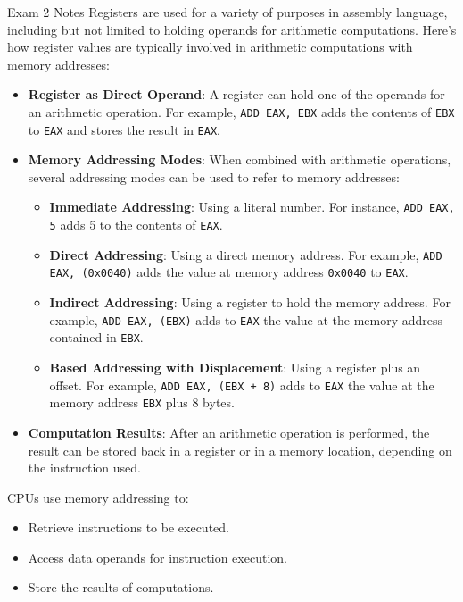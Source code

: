 \begin{examnotes}{Exam 2 Notes}
    Registers are used for a variety of purposes in assembly language, including but not limited to holding operands for arithmetic computations. Here's how register values are typically involved in 
    arithmetic computations with memory addresses:

    \begin{itemize}
        \item \textbf{Register as Direct Operand}: A register can hold one of the operands for an arithmetic operation. For example, \texttt{ADD EAX, EBX} adds the contents of \texttt{EBX} to \texttt{EAX} 
        and stores the result in \texttt{EAX}.
        \item \textbf{Memory Addressing Modes}: When combined with arithmetic operations, several addressing modes can be used to refer to memory addresses:
        \begin{itemize}
            \item \textbf{Immediate Addressing}: Using a literal number. For instance, \texttt{ADD EAX, 5} adds 5 to the contents of \texttt{EAX}.
            \item \textbf{Direct Addressing}: Using a direct memory address. For example, \texttt{ADD EAX, (0x0040)} adds the value at memory address \texttt{0x0040} to \texttt{EAX}.
            \item \textbf{Indirect Addressing}: Using a register to hold the memory address. For example, \texttt{ADD EAX, (EBX)} adds to \texttt{EAX} the value at the memory address contained in 
            \texttt{EBX}.
            \item \textbf{Based Addressing with Displacement}: Using a register plus an offset. For example, \texttt{ADD EAX, (EBX + 8)} adds to \texttt{EAX} the value at the memory address \texttt{EBX} 
            plus 8 bytes.
        \end{itemize}
        \item \textbf{Computation Results}: After an arithmetic operation is performed, the result can be stored back in a register or in a memory location, depending on the instruction used.
    \end{itemize}

    CPUs use memory addressing to:

    \begin{itemize}
        \item Retrieve instructions to be executed.
        \item Access data operands for instruction execution.
        \item Store the results of computations.
    \end{itemize}


\end{examnotes}
